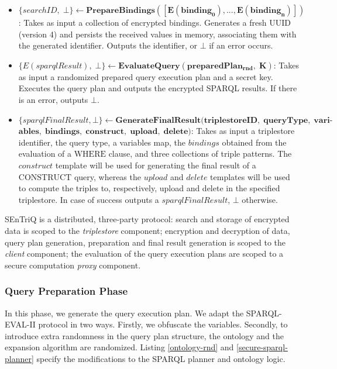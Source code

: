 \begin{definition}
\begin{itemize}
        \item $\{ searchID, \; \bot \} \leftarrow \mathbf{PrepareBindings([E(binding_0),...,E(binding_n)])}$: Takes as input a collection of encrypted bindings. Generates a fresh \gls{UUID} (version 4) and persists the received values in memory, associating them with the generated identifier. Outputs the identifier, or $\bot$ if an error occurs.

        \item $\{E(sparqlResult), \; \bot\} \leftarrow \mathbf{EvaluateQuery(preparedPlan_{rnd}, \; K)}$: Takes as input a randomized prepared query execution plan and a secret key. Executes the query plan and outputs the encrypted \gls{SPARQL} results. If there is an error, outputs $\bot$.

        \item $\{sparqlFinalResult, \bot\} \leftarrow \mathbf{GenerateFinalResult(triplestoreID, \; queryType, \; vari\textrm{-}}$ \linebreak $\mathbf{ables, \; bindings, \; construct, \; upload, \; delete)}$: Takes as input a triplestore identifier, the query type, a variables map, the $bindings$ obtained from the evaluation of a $\textrm{WHERE}$ clause, and three collections of triple patterns. The $construct$ template will be used for generating the final result of a $\textrm{CONSTRUCT}$ query, whereas the $upload$ and $delete$ templates will be used to compute the triples to, respectively, upload and delete in the specified triplestore. In case of success outputs a $sparqlFinalResult$, $\bot$ otherwise.
    \end{itemize}
    SEnTriQ is a distributed, three-party protocol: search and storage of encrypted data is scoped to the \emph{triplestore} component; encryption and decryption of data, query plan generation, preparation and final result generation is scoped to the \emph{client} component; the evaluation of the query execution plans are scoped to a secure computation \emph{proxy} component.
\end{definition}

\subsubsection{Query Preparation Phase} In this phase, we generate the query execution plan. We adapt the SPARQL-EVAL-II protocol in two ways. Firstly, we obfuscate the variables. Secondly, to introduce extra randomness in the query plan structure, the ontology and the expansion algorithm are randomized. Listing \ref{ontology-rnd} and \ref{secure-sparql-planner} specify the modifications to the \gls{SPARQL} planner and ontology logic.

